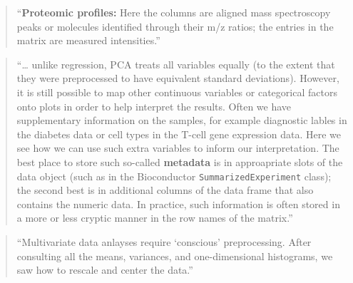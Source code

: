 \documentclass[]{tufte-book}
\begin{document}
\begin{quote}
``\textbf{Proteomic profiles:} Here the columns are aligned mass spectroscopy peaks
or molecules identified through their m/z ratios; the entries in the matrix
are measured intensities.'' \citep{holmes2018modern}
\end{quote}

\begin{quote}
``\ldots{} unlike regression, PCA treats all variables equally (to the extent that
they were preprocessed to have equivalent standard deviations). However, it is
still possible to map other continuous variables or categorical factors onto
plots in order to help interpret the results. Often we have supplementary
information on the samples, for example diagnostic lables in the diabetes
data or cell types in the T-cell gene expression data. Here we see how we
can use such extra variables to inform our interpretation. The best place to
store such so-called \textbf{metadata} is in approapriate slots of the data object
(such as in the Bioconductor \texttt{SummarizedExperiment} class); the second best
is in additional columns of the data frame that also contains the numeric
data. In practice, such information is often stored in a more or less
cryptic manner in the row names of the matrix.'' \citep{holmes2018modern}
\end{quote}

\begin{quote}
``Multivariate data anlayses require `conscious' preprocessing. After
consulting all the means, variances, and one-dimensional histograms, we
saw how to rescale and center the data.'' \citep{holmes2018modern}
\end{quote}
\end{document}
